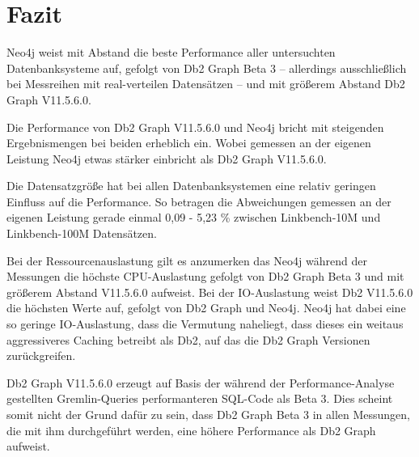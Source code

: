 \chapter{Fazit}

Neo4j weist mit Abstand die beste Performance aller untersuchten Datenbanksysteme auf, gefolgt von Db2 Graph Beta 3 -- allerdings ausschließlich bei Messreihen mit real-verteilen Datensätzen -- und mit größerem Abstand Db2 Graph V11.5.6.0.

Die Performance von Db2 Graph V11.5.6.0 und Neo4j bricht mit steigenden Ergebnismengen bei beiden erheblich ein. Wobei gemessen an der eigenen Leistung Neo4j etwas stärker einbricht als Db2 Graph V11.5.6.0.

Die Datensatzgröße hat bei allen Datenbanksystemen eine relativ geringen Einfluss auf die Performance. So betragen die Abweichungen gemessen an der eigenen Leistung  gerade einmal 0,09 - 5,23 \% zwischen Linkbench-10M und Linkbench-100M Datensätzen.  

Bei der Ressourcenauslastung gilt es anzumerken das Neo4j während der Messungen die höchste CPU-Auslastung gefolgt von Db2 Graph Beta 3 und mit größerem Abstand V11.5.6.0 aufweist. Bei der IO-Auslastung weist Db2 V11.5.6.0 die höchsten Werte auf, gefolgt von Db2 Graph und Neo4j. Neo4j hat dabei eine so geringe IO-Auslastung, dass die Vermutung naheliegt, dass dieses ein weitaus aggressiveres Caching betreibt als Db2, auf das die Db2 Graph Versionen zurückgreifen. 

Db2 Graph V11.5.6.0 erzeugt auf Basis der während der Performance-Analyse gestellten Gremlin-Queries performanteren SQL-Code als Beta 3. Dies scheint somit nicht der Grund dafür zu sein, dass Db2 Graph Beta 3 in allen Messungen, die mit ihm durchgeführt werden, eine höhere Performance als Db2 Graph aufweist. 


\listoftodos